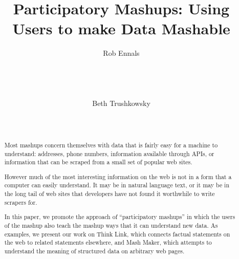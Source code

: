 \documentclass{chi2009}
\begin{document}
\setlength{\paperheight}{11in}
\setlength{\paperwidth}{8.5in}
\setlength{\pdfpageheight}{\paperheight}
\setlength{\pdfpagewidth}{\paperwidth}
%

\title{Participatory Mashups: Using Users to make Data Mashable}



\author{
\alignauthor Rob Ennals\\
       \\
       \\
       \\
       \\
\alignauthor Beth Trushkowsky\\
       \\
       \\
}
\sloppy 

\maketitle

\begin{abstract}
Most mashups concern themselves with data that is fairly easy for a machine to understand: addresses, phone numbers, information available through APIs, or information that can be scraped from a small set of popular web sites.

However much of the most interesting information on the web is not in a form that a computer can easily understand. It may be in natural language text, or it may be in the long tail of web sites that developers have not found it worthwhile to write scrapers for.

In this paper, we promote the approach of ``participatory mashups'' in which the users of the mashup also teach the mashup ways that it can understand new data. As examples, we present our work on Think Link, which connects factual statements on the web to related statements elsewhere, and Mash Maker, which attempts to understand the meaning of structured data on arbitrary web pages.
\end{abstract}
\end{document}
